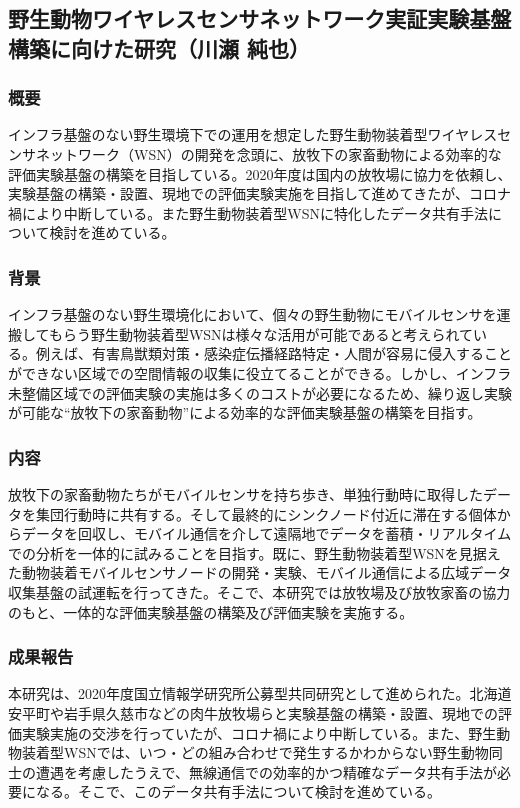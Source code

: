 \subsection{野生動物ワイヤレスセンサネットワーク実証実験基盤構築に向けた研究（川瀬 純也）}
\subsubsection{概要}
インフラ基盤のない野生環境下での運用を想定した野生動物装着型ワイヤレスセンサネットワーク（WSN）の開発を念頭に、放牧下の家畜動物による効率的な評価実験基盤の構築を目指している。2020年度は国内の放牧場に協力を依頼し、実験基盤の構築・設置、現地での評価実験実施を目指して進めてきたが、コロナ禍により中断している。また野生動物装着型WSNに特化したデータ共有手法について検討を進めている。
\subsubsection{背景}
インフラ基盤のない野生環境化において、個々の野生動物にモバイルセンサを運搬してもらう野生動物装着型WSNは様々な活用が可能であると考えられている。例えば、有害鳥獣類対策・感染症伝播経路特定・人間が容易に侵入することができない区域での空間情報の収集に役立てることができる。しかし、インフラ未整備区域での評価実験の実施は多くのコストが必要になるため、繰り返し実験が可能な“放牧下の家畜動物”による効率的な評価実験基盤の構築を目指す。
\subsubsection{内容}
放牧下の家畜動物たちがモバイルセンサを持ち歩き、単独行動時に取得したデータを集団行動時に共有する。そして最終的にシンクノード付近に滞在する個体からデータを回収し、モバイル通信を介して遠隔地でデータを蓄積・リアルタイムでの分析を一体的に試みることを目指す。既に、野生動物装着型WSNを見据えた動物装着モバイルセンサノードの開発・実験、モバイル通信による広域データ収集基盤の試運転を行ってきた。そこで、本研究では放牧場及び放牧家畜の協力のもと、一体的な評価実験基盤の構築及び評価実験を実施する。
\subsubsection  {成果報告}
本研究は、2020年度国立情報学研究所公募型共同研究として進められた。北海道安平町や岩手県久慈市などの肉牛放牧場らと実験基盤の構築・設置、現地での評価実験実施の交渉を行っていたが、コロナ禍により中断している。また、野生動物装着型WSNでは、いつ・どの組み合わせで発生するかわからない野生動物同士の遭遇を考慮したうえで、無線通信での効率的かつ精確なデータ共有手法が必要になる。そこで、このデータ共有手法について検討を進めている。
